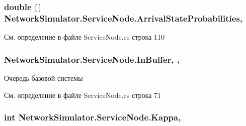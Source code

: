 \subsubsection[{\texorpdfstring{Arrival\+State\+Probabilities}{ArrivalStateProbabilities}}]{\setlength{\rightskip}{0pt plus 5cm}double \mbox{[}$\,$\mbox{]} Network\+Simulator.\+Service\+Node.\+Arrival\+State\+Probabilities\hspace{0.3cm}{\ttfamily [get]}, {\ttfamily [set]}}\hypertarget{class_network_simulator_1_1_service_node_afd54347835b7cdc3beacaa0c9eaf8592}{}\label{class_network_simulator_1_1_service_node_afd54347835b7cdc3beacaa0c9eaf8592}


См. определение в файле Service\+Node.\+cs строка 110

\subsubsection[{\texorpdfstring{In\+Buffer}{InBuffer}}]{ Network\+Simulator.\+Service\+Node.\+In\+Buffer\hspace{0.3cm}{\ttfamily [get]}, {\ttfamily [set]}, {\ttfamily [protected]}}\hypertarget{class_network_simulator_1_1_service_node_ae4baae1147ffac6e43ab3c5917849473}{}\label{class_network_simulator_1_1_service_node_ae4baae1147ffac6e43ab3c5917849473}


Очередь базовой системы 



См. определение в файле Service\+Node.\+cs строка 71

\subsubsection[{\texorpdfstring{Kappa}{Kappa}}]{\setlength{\rightskip}{0pt plus 5cm}int Network\+Simulator.\+Service\+Node.\+Kappa\hspace{0.3cm}{\ttfamily [get]}, {}}\hypertarget{class_network_simulator_1_1_service_node_a508a5abec3a03da2a2c98bd77d9f27e9}{}\label{class_network_simulator_1_1_service_node_a508a5abec3a03da2a2c98bd77d9f27e9}


